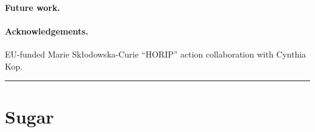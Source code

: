 \documentclass[letterpaper,11pt]{article}
\begin{document}
\paragraph*{Future work.} 


\paragraph*{Acknowledgements.} 

EU-funded Marie Skłodowska-Curie ``HORIP'' action collaboration with Cynthia Kop.






\hrule
\vspace*{1pc}

\appendix

\section{Sugar}
\end{document}
